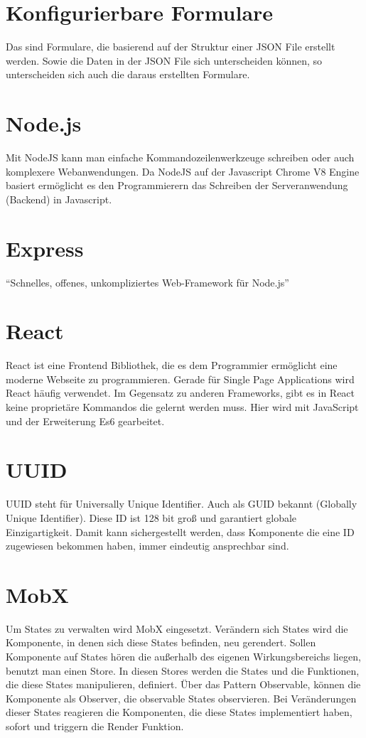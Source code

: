 \documentclass[a4paper,11pt]{scrreprt}
\begin{document}
\section{Konfigurierbare Formulare}
Das sind Formulare, die basierend auf der Struktur einer JSON File erstellt werden. Sowie die Daten in der JSON File sich unterscheiden können, so unterscheiden sich auch die daraus erstellten Formulare.


\section{Node.js}
Mit NodeJS kann man einfache Kommandozeilenwerkzeuge schreiben oder auch
komplexere Webanwendungen. Da NodeJS auf der Javascript Chrome V8 Engine basiert
ermöglicht es den Programmierern das Schreiben der Serveranwendung (Backend) in
Javascript. \cite{Weiss2019}

\section{Express}
“Schnelles, offenes, unkompliziertes Web-Framework für Node.js” \cite{None2019}

\section{React}
React ist eine Frontend Bibliothek, die es dem Programmier ermöglicht eine moderne Webseite zu programmieren. 
Gerade für Single Page Applications wird React häufig verwendet. Im Gegensatz zu anderen Frameworks, gibt es in React keine proprietäre Kommandos die gelernt werden muss. Hier wird mit JavaScript und der Erweiterung Es6 gearbeitet. 


\section{UUID}
UUID steht für Universally Unique Identifier. Auch als GUID bekannt (Globally Unique Identifier). Diese ID ist 128 bit groß und garantiert globale Einzigartigkeit. \cite{rfc4122} Damit kann sichergestellt werden, dass Komponente die eine ID zugewiesen bekommen haben, immer eindeutig ansprechbar sind.

\section{MobX}
Um States zu verwalten wird MobX eingesetzt. Verändern sich States wird die Komponente, in denen sich diese States befinden, neu gerendert. Sollen Komponente auf States hören die außerhalb des eigenen Wirkungsbereichs liegen, benutzt man einen Store. In diesen Stores werden die States und die Funktionen, die diese States manipulieren, definiert. Über das Pattern Observable, können die Komponente als Observer, die observable States observieren. Bei Veränderungen dieser States reagieren die Komponenten, die diese States implementiert haben, sofort und triggern die Render Funktion. 
\end{document}
